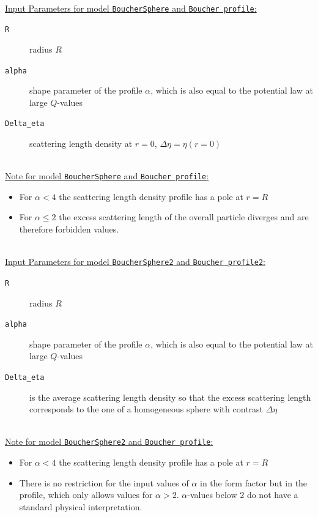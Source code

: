 \vspace{5mm}

\hspace{1pt}\\
\uline{Input Parameters for model \texttt{BoucherSphere} and \texttt{Boucher profile}:}
\begin{description}
\item[\texttt{R}] radius $R$
\item[\texttt{alpha}] shape parameter of the profile $\alpha$, which is also equal to the potential law at large $Q$-values
\item[\texttt{Delta\_eta}] scattering length density at $r=0$, $\Delta\eta=\eta(r=0)$
\end{description}

\hspace{1pt}\\
\noindent\uline{Note for model \texttt{BoucherSphere} and \texttt{Boucher profile}:}
\begin{itemize}
\item For $\alpha<4$ the scattering length density profile has a pole at $r=R$
\item For $\alpha \leq 2$ the excess scattering length of the overall particle diverges and are therefore forbidden values.
\end{itemize}

\hspace{1pt}\\
\uline{Input Parameters for model \texttt{BoucherSphere2} and \texttt{Boucher profile2}:}
\begin{description}
\item[\texttt{R}] radius $R$
\item[\texttt{alpha}] shape parameter of the profile $\alpha$, which is also equal to the potential law at large $Q$-values
\item[\texttt{Delta\_eta}] is the average scattering length density so that the excess scattering length corresponds to the one of a homogeneous sphere with contrast $\Delta\eta$
\end{description}

\hspace{1pt}\\
\noindent\uline{Note for model \texttt{BoucherSphere2} and \texttt{Boucher profile}:}
\begin{itemize}
\item For $\alpha<4$ the scattering length density profile has a pole at $r=R$
\item There is no restriction for the input values of $\alpha$ in the form factor but in the profile, which only allows values for $\alpha>2$.  $\alpha$-values below 2 do not have a standard physical interpretation.
\end{itemize}


